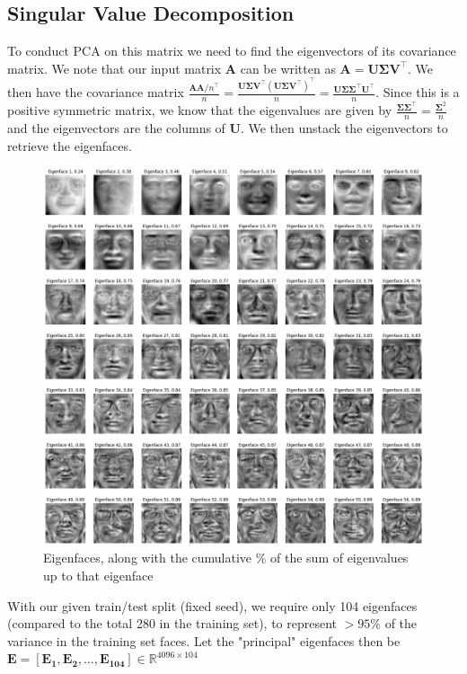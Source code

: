 \documentclass[article]{article}
\begin{document}
\subsection{Singular Value Decomposition}
To conduct PCA on this matrix we need to find the eigenvectors of its covariance matrix. We note that our input matrix $\mathbf{A}$ can be written as $\mathbf{A} = \mathbf{U \Sigma V}^\top$. We then have the covariance matrix $ \frac{\mathbf{A} \mathbf{A}/n ^\top}{n} = \frac{\mathbf{U \Sigma V}^\top (\mathbf{U \Sigma V}^\top) ^\top}{n} = \frac{\mathbf{U \Sigma \Sigma ^\top U^\top}}{n}$. Since this is a positive symmetric matrix, we know that the eigenvalues are given by $ \frac{\mathbf{\Sigma \Sigma}^\top}{n}  = \frac{\mathbf{\Sigma}^2}{n}$ and the eigenvectors are the columns of $\mathbf{U}$. We then unstack the eigenvectors to retrieve the eigenfaces.

\begin{figure}[H]
    \centering
    \includegraphics[width=1\linewidth]{eigenfaces-variance.png}
    \caption{Eigenfaces, along with the cumulative \% of the sum of eigenvalues up to that eigenface}
    \label{fig:eigenfaces}
\end{figure}

With our given train/test split (fixed seed), we require only 104 eigenfaces (compared to the total 280 in the training set), to represent $>95\%$ of the variance in the training set faces. Let the "principal" eigenfaces then be $\mathbf{E = [E_1, E_2, \dots, E_{104}]} \in \mathbb{R}^{4096\times 104}$
\end{document}
